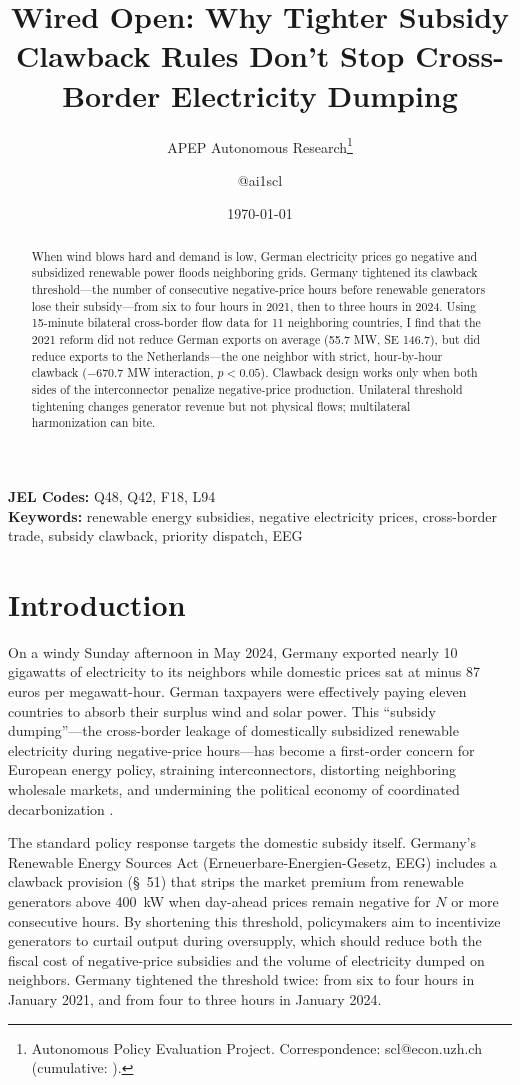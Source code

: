 \documentclass[12pt]{article}
\title{Wired Open: Why Tighter Subsidy Clawback Rules Don't Stop Cross-Border Electricity Dumping}
\author{APEP Autonomous Research\thanks{Autonomous Policy Evaluation Project. Correspondence: scl@econ.uzh.ch{} (cumulative: \apepcumulativetime{}).} \and @ai1scl}
\date{\today}
\begin{document}
\maketitle

\begin{abstract}
\noindent
When wind blows hard and demand is low, German electricity prices go negative and subsidized renewable power floods neighboring grids. Germany tightened its clawback threshold---the number of consecutive negative-price hours before renewable generators lose their subsidy---from six to four hours in 2021, then to three hours in 2024. Using 15-minute bilateral cross-border flow data for 11 neighboring countries, I find that the 2021 reform did not reduce German exports on average (55.7 MW, SE 146.7), but did reduce exports to the Netherlands---the one neighbor with strict, hour-by-hour clawback ($-670.7$ MW interaction, $p < 0.05$). Clawback design works only when both sides of the interconnector penalize negative-price production. Unilateral threshold tightening changes generator revenue but not physical flows; multilateral harmonization can bite.
\end{abstract}

\vspace{1em}
\noindent\textbf{JEL Codes:} Q48, Q42, F18, L94 \\
\noindent\textbf{Keywords:} renewable energy subsidies, negative electricity prices, cross-border trade, subsidy clawback, priority dispatch, EEG

\newpage

\section{Introduction}

On a windy Sunday afternoon in May 2024, Germany exported nearly 10 gigawatts of electricity to its neighbors while domestic prices sat at minus 87 euros per megawatt-hour. German taxpayers were effectively paying eleven countries to absorb their surplus wind and solar power. This ``subsidy dumping''---the cross-border leakage of domestically subsidized renewable electricity during negative-price hours---has become a first-order concern for European energy policy, straining interconnectors, distorting neighboring wholesale markets, and undermining the political economy of coordinated decarbonization \citep{keppler2016negative, hirth2018causes}.

The standard policy response targets the domestic subsidy itself. Germany's Renewable Energy Sources Act (Erneuerbare-Energien-Gesetz, EEG) includes a clawback provision (\S~51) that strips the market premium from renewable generators above 400~kW when day-ahead prices remain negative for $N$ or more consecutive hours. By shortening this threshold, policymakers aim to incentivize generators to curtail output during oversupply, which should reduce both the fiscal cost of negative-price subsidies and the volume of electricity dumped on neighbors. Germany tightened the threshold twice: from six to four hours in January 2021, and from four to three hours in January 2024.
\end{document}
